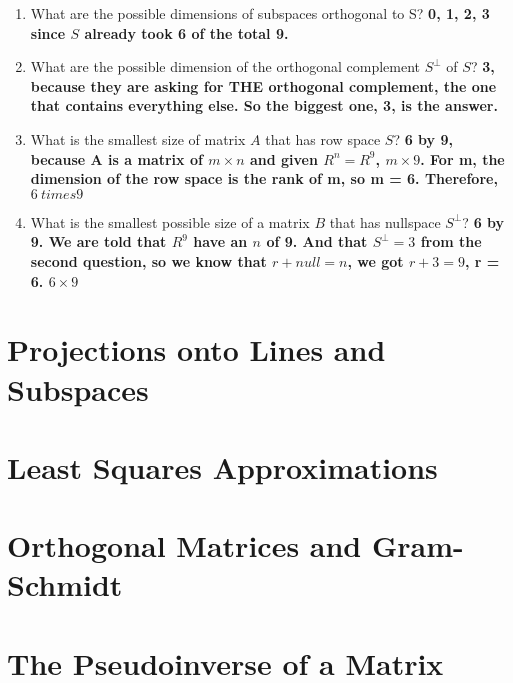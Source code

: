 \begin{enumerate}
    \item What are the possible dimensions of subspaces orthogonal to S? \textbf{0, 1, 2, 3 since \(S\) already took 6 of the total 9.}
    \item What are the possible dimension of the orthogonal complement \(S^{\perp}\) of \(S\)? \textbf{3, because they are asking for THE orthogonal complement, the one that contains everything else. So the biggest one, 3, is the answer. }
    \item What is the smallest size of matrix \(A\) that has row space \(S\)? \textbf{6 by 9, because A is a matrix of \(m \times n\) and given  \(R^n = R^9\), \(m \times 9\). For m, the dimension of the row space is the rank of m, so m = 6. Therefore, \(6 \ times 9\)  }
    \item What is the smallest possible size of a matrix \(B\) that has nullspace \(S^{\perp}\)? \textbf{6 by 9. We are told that \(R^9\) have an \(n\) of 9. And that \(S^{\perp} = 3\) from the second question, so we know that \(r + null = n \), we got \(r + 3 = 9\), r = 6. \(6 \times 9\)      }         
\end{enumerate} 

\section{Projections onto Lines and Subspaces}

\section{Least Squares Approximations}

\section{Orthogonal Matrices and Gram-Schmidt}

\section{The Pseudoinverse of a Matrix}
